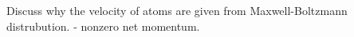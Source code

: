 

Discuss why the velocity of atoms are given from Maxwell-Boltzmann distrubution.  - nonzero net momentum. 